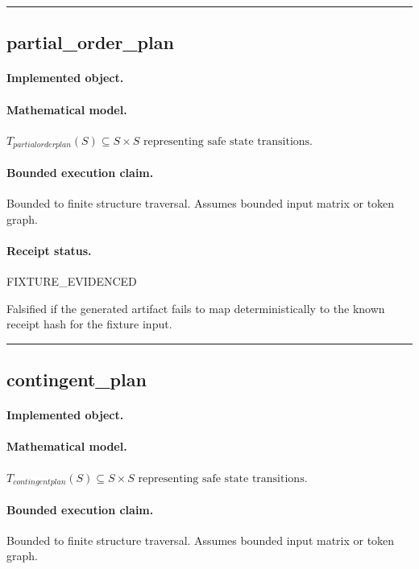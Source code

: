 \vspace{1em}\hrule\vspace{1em}
\subsection{partial\_order\_plan}
\paragraph{Implemented object.} 
\paragraph{Mathematical model.} $T_{partialorderplan}(S) \subseteq S \times S \text{ representing safe state transitions}.$
\paragraph{Bounded execution claim.} Bounded to finite structure traversal. Assumes bounded input matrix or token graph.
\paragraph{Receipt status.} FIXTURE\_EVIDENCED
\begin{falsifier}
Falsified if the generated artifact fails to map deterministically to the known receipt hash for the fixture input.
\end{falsifier}

\vspace{1em}\hrule\vspace{1em}
\subsection{contingent\_plan}
\paragraph{Implemented object.} 
\paragraph{Mathematical model.} $T_{contingentplan}(S) \subseteq S \times S \text{ representing safe state transitions}.$
\paragraph{Bounded execution claim.} Bounded to finite structure traversal. Assumes bounded input matrix or token graph.
